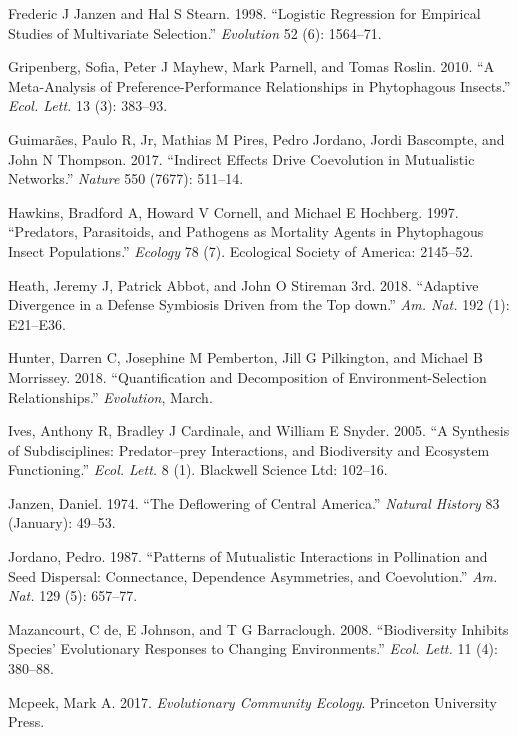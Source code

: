 \documentclass[]{elsarticle} %
\begin{document}
\hypertarget{ref-Janzen1998}{}
Frederic J Janzen and Hal S Stearn. 1998. ``Logistic Regression for
Empirical Studies of Multivariate Selection.'' \emph{Evolution} 52 (6):
1564--71.

\hypertarget{ref-Gripenberg2010}{}
Gripenberg, Sofia, Peter J Mayhew, Mark Parnell, and Tomas Roslin. 2010.
``A Meta-Analysis of Preference-Performance Relationships in
Phytophagous Insects.'' \emph{Ecol. Lett.} 13 (3): 383--93.

\hypertarget{ref-Guimaraes2017}{}
Guimarães, Paulo R, Jr, Mathias M Pires, Pedro Jordano, Jordi Bascompte,
and John N Thompson. 2017. ``Indirect Effects Drive Coevolution in
Mutualistic Networks.'' \emph{Nature} 550 (7677): 511--14.

\hypertarget{ref-Hawkins1997}{}
Hawkins, Bradford A, Howard V Cornell, and Michael E Hochberg. 1997.
``Predators, Parasitoids, and Pathogens as Mortality Agents in
Phytophagous Insect Populations.'' \emph{Ecology} 78 (7). Ecological
Society of America: 2145--52.

\hypertarget{ref-Heath2018}{}
Heath, Jeremy J, Patrick Abbot, and John O Stireman 3rd. 2018.
``Adaptive Divergence in a Defense Symbiosis Driven from the Top down.''
\emph{Am. Nat.} 192 (1): E21--E36.

\hypertarget{ref-Hunter2018}{}
Hunter, Darren C, Josephine M Pemberton, Jill G Pilkington, and Michael
B Morrissey. 2018. ``Quantification and Decomposition of
Environment-Selection Relationships.'' \emph{Evolution}, March.

\hypertarget{ref-Ives2005}{}
Ives, Anthony R, Bradley J Cardinale, and William E Snyder. 2005. ``A
Synthesis of Subdisciplines: Predator--prey Interactions, and
Biodiversity and Ecosystem Functioning.'' \emph{Ecol. Lett.} 8 (1).
Blackwell Science Ltd: 102--16.

\hypertarget{ref-Janzen1974}{}
Janzen, Daniel. 1974. ``The Deflowering of Central America.''
\emph{Natural History} 83 (January): 49--53.

\hypertarget{ref-Jordano1987}{}
Jordano, Pedro. 1987. ``Patterns of Mutualistic Interactions in
Pollination and Seed Dispersal: Connectance, Dependence Asymmetries, and
Coevolution.'' \emph{Am. Nat.} 129 (5): 657--77.

\hypertarget{ref-De_Mazancourt2008}{}
Mazancourt, C de, E Johnson, and T G Barraclough. 2008. ``Biodiversity
Inhibits Species' Evolutionary Responses to Changing Environments.''
\emph{Ecol. Lett.} 11 (4): 380--88.

\hypertarget{ref-McPeek2017}{}
Mcpeek, Mark A. 2017. \emph{Evolutionary Community Ecology}. Princeton
University Press.
\end{document}
